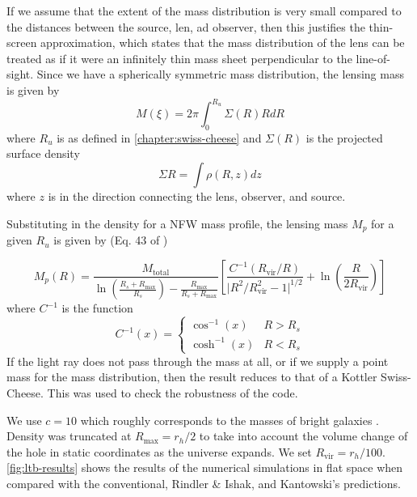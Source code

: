 If we assume that the extent of the mass distribution is very small compared to the distances between the source, len, ad observer, then this justifies the thin-screen approximation, which states that the mass distribution of the lens can be treated as if it were an infinitely thin mass sheet perpendicular to the line-of-sight. Since we have a spherically symmetric mass distribution, the lensing mass is given by
\begin{equation}
  M(\xi) = 2\pi \int_0^{R_u} \Sigma(R) R dR
  \label{eq:ltb-projected-mass}
\end{equation}
where $R_u$ is as defined in \autoref{chapter:swiss-cheese} and $\Sigma(R)$ is the projected surface density
\begin{equation}
  \Sigma{R} = \int \rho(R, z) dz 
  \label{eq:ltb-projected-surface-density}
\end{equation}
where $z$ is in the direction connecting the lens, observer, and source. 

Substituting in the density for a NFW mass profile, the lensing mass $M_p$ for a given $R_u$ is given by (Eq. 43 of \citet{lokas2001properties})

\begin{equation}
  M_p(R) = \frac{M_{\text{total}}}{\ln\left ( \frac{R_s + R_{\text{max}}}{R_s}\right) - \frac{R_{\text{max}}}{R_s + R_{\text{max}}}} \left [\frac{C^{-1}(R_{\text{vir}}/R)}{\mathopen| R^2/R_{\text{vir}}^2 - 1 \mathclose|^{1/2}} + \ln \left ( \frac{R}{2 R_{\text{vir}}}\right ) \right ]
\end{equation}
where $C^{-1}$ is the function
\begin{equation}
  C^{-1}(x) = 
  \begin{cases}
    \cos^{-1}(x)  & R > R_s\\
    \cosh^{-1}(x) & R < R_s
  \end{cases}
\end{equation}
If the light ray does not pass through the mass at all, or if we supply a point mass for the mass distribution, then the result reduces to that of a Kottler Swiss-Cheese. This was used to check the robustness of the code. 

We use $c = 10$ which roughly corresponds to the masses of bright galaxies \citep{lokas2001properties}. Density was truncated at $R_{\text{max}} = r_h/2$ to take into account the volume change of the hole in static coordinates as the universe expands. We set $R_{\text{vir}} = r_h/100$. \autoref{fig:ltb-results} shows the results of the numerical simulations in flat space when compared with the conventional, Rindler \& Ishak, and Kantowski's predictions. 


